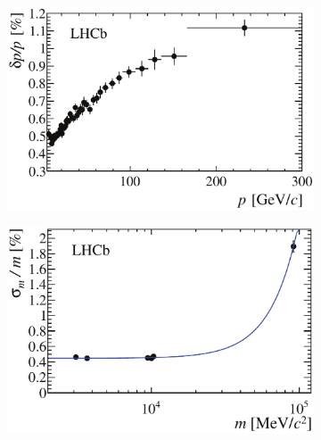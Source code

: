 \begin{figure}[ptb]
  \begin{subfigure}{0.49\textwidth}
    \includegraphics[width=\textwidth]{graphics/intro/dppVsp-crop-cmyk}
    \caption{}
    \label{fig:detPerf_momRes}
  \end{subfigure}%
  \hfill%
  \begin{subfigure}{0.49\textwidth}
    \includegraphics[width=\textwidth]{graphics/intro/relResolutionVsMass-crop-cmyk}
    \caption{}
    \label{fig:detPerf_massRes}
  \end{subfigure} \\

  \vspace*{0.01\textwidth}


\end{figure}
